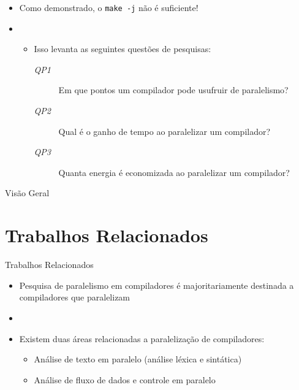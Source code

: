 \begin{frame}
    \begin{itemize}
        \item Como demonstrado, o \texttt{make -j} não é suficiente!
        \item[]
        \begin{itemize}
            \item Isso levanta as seguintes questões de pesquisas:
            \begin{description}
                \item[\textit{QP1}] Em que pontos um compilador pode usufruir de paralelismo?
                \item[\textit{QP2}] Qual é o ganho de tempo ao paralelizar um compilador?
                \item[\textit{QP3}] Quanta energia é economizada ao paralelizar um compilador?
            \end{description}
        \end{itemize}
    \end{itemize}
\end{frame}



\begin{frame}{Visão Geral}
  \overview
\end{frame}

\section{Trabalhos Relacionados}

\begin{frame}{Trabalhos Relacionados}
    \begin{itemize}
        \item Pesquisa de paralelismo em compiladores é majoritariamente destinada a compiladores que paralelizam
        \item[]
        \item Existem duas áreas relacionadas a paralelização de compiladores:
        \begin{itemize}
            \item Análise de texto em paralelo (análise léxica e sintática)
            \item Análise de fluxo de dados e controle em paralelo
        \end{itemize}
    \end{itemize}
\end{frame}

